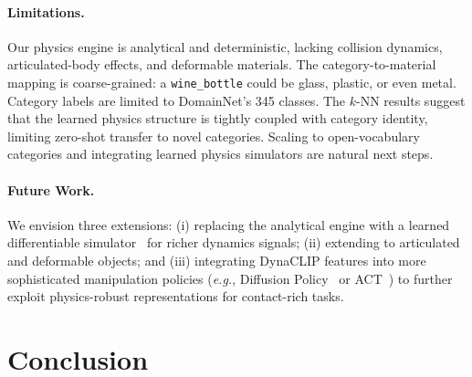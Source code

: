 \documentclass{article}
\newcommand{\methodname}{DynaCLIP}
\newcommand{\eg}{\textit{e.g.}}
\begin{document}
\paragraph{Limitations.}
Our physics engine is analytical and deterministic, lacking collision dynamics, articulated-body effects, and deformable materials. The category-to-material mapping is coarse-grained: a \texttt{wine\_bottle} could be glass, plastic, or even metal. Category labels are limited to DomainNet's 345 classes. The $k$-NN results suggest that the learned physics structure is tightly coupled with category identity, limiting zero-shot transfer to novel categories. Scaling to open-vocabulary categories and integrating learned physics simulators are natural next steps.

\paragraph{Future Work.}
We envision three extensions: (i) replacing the analytical engine with a learned differentiable simulator~\cite{toussaint2018differentiable} for richer dynamics signals; (ii) extending to articulated and deformable objects; and (iii) integrating \methodname{} features into more sophisticated manipulation policies (\eg, Diffusion Policy~\cite{chi2023diffusion} or ACT~\cite{zhao2023act}) to further exploit physics-robust representations for contact-rich tasks.


\section{Conclusion}
\label{sec:conclusion}
\end{document}
